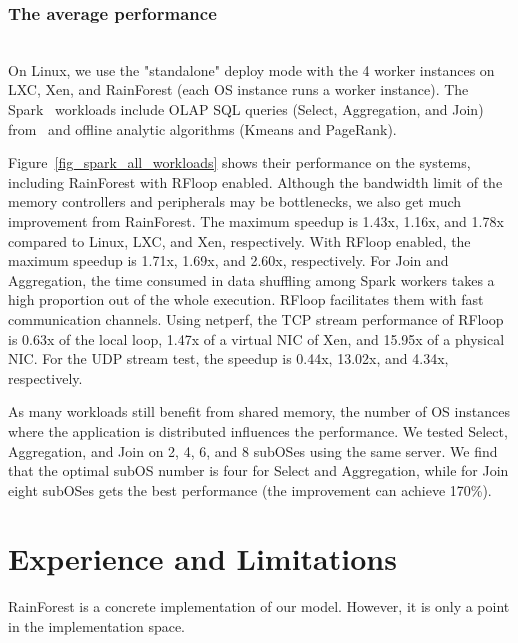 \documentclass[pageno]{jpaper}
\begin{document}
\subsubsection{The average performance}\label{evaluation_spark}
\textrm{\\} On Linux, we use the "standalone" deploy mode with the  4 worker instances on LXC, Xen, and RainForest (each OS instance runs a worker instance). The Spark~\cite{zaharia2012resilient} workloads include OLAP SQL queries (Select, Aggregation, and Join) from~\cite{Wang:2014:BigDataBench, pavlo2009comparison} and offline analytic algorithms (Kmeans and PageRank).


Figure~\ref{fig_spark_all_workloads} shows their performance on the systems, including RainForest with RFloop enabled. Although the bandwidth limit of the memory controllers and peripherals may be bottlenecks, we also get much improvement from RainForest. The maximum speedup is 1.43x, 1.16x, and 1.78x  compared to Linux, LXC, and Xen, respectively. With RFloop enabled, the maximum speedup is  1.71x, 1.69x, and 2.60x, respectively. For Join and Aggregation, the time consumed in data shuffling among Spark workers takes a high proportion out of the whole execution. RFloop facilitates them with fast communication channels. Using netperf, the TCP stream performance of RFloop is 0.63x of the local loop, 1.47x of a virtual NIC of Xen, and 15.95x of a physical NIC. For the UDP stream test, the speedup is 0.44x, 13.02x, and 4.34x, respectively.

As many workloads still benefit from shared memory, the number of OS instances where the application is distributed influences the performance. We tested Select, Aggregation, and Join on 2, 4, 6, and 8 subOSes using the same server. We find that the optimal subOS number is four for Select and Aggregation, while for Join eight subOSes gets the best performance (the improvement can achieve 170\%).
 \section{Experience and Limitations}













RainForest is a concrete implementation of our model. However, it is only a point in the implementation space.
\end{document}

